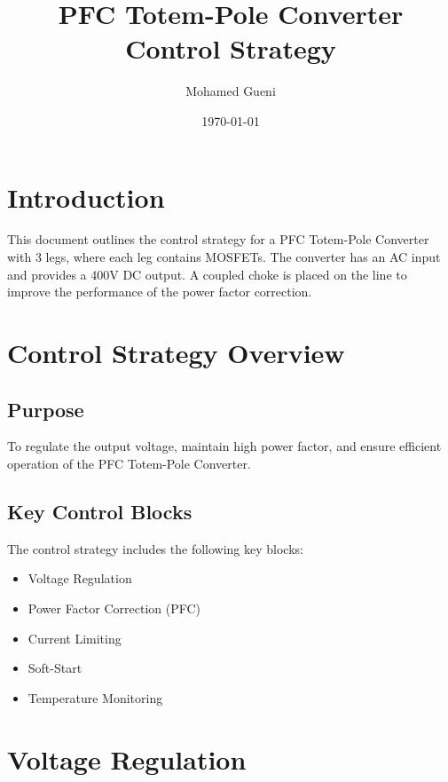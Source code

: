 \documentclass{article}
\begin{document}
\title{PFC Totem-Pole Converter Control Strategy}
\author{Mohamed Gueni}
\date{\today}
\maketitle
\tableofcontents
\section{Introduction}
\label{sec:introduction}
This document outlines the control strategy for a PFC Totem-Pole Converter with 3 legs, where each leg contains MOSFETs. The converter has an AC input and provides a 400V DC output. A coupled choke is placed on the line to improve the performance of the power factor correction.

\section{Control Strategy Overview}
\label{sec:control_strategy_overview}
\subsection{Purpose}
To regulate the output voltage, maintain high power factor, and ensure efficient operation of the PFC Totem-Pole Converter.

\subsection{Key Control Blocks}
The control strategy includes the following key blocks:
\begin{itemize}
    \item Voltage Regulation
    \item Power Factor Correction (PFC)
    \item Current Limiting
    \item Soft-Start
    \item Temperature Monitoring
\end{itemize}

\section{Voltage Regulation}
\label{sec:voltage_regulation}
\end{document}
